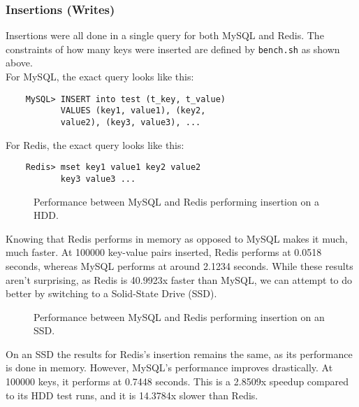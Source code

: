 \documentclass[letterpaper, 10 pt, conference]{ieeeconf}
\begin{document}
\subsubsection{Insertions (Writes)}
Insertions were all done in a single query for both MySQL and Redis. The constraints of how many keys were inserted are defined by \texttt{bench.sh} as shown above.\\
For MySQL, the exact query looks like this:
\begin{verbatim}
    MySQL> INSERT into test (t_key, t_value)
           VALUES (key1, value1), (key2,
           value2), (key3, value3), ...
\end{verbatim}
For Redis, the exact query looks like this:
\begin{verbatim}
    Redis> mset key1 value1 key2 value2
           key3 value3 ...
\end{verbatim}
\begin{figure}[h]
    \centering
    
    \caption{Performance between MySQL and Redis performing insertion on a HDD.}
    \label{fig:mesh1}
\end{figure}
Knowing that Redis performs in memory as opposed to MySQL makes it much, much faster. At 100000 key-value pairs inserted, Redis performs at 0.0518 seconds, whereas MySQL performs at around 2.1234 seconds. While these results aren't surprising, as Redis is 40.9923x faster than MySQL, we can attempt to do better by switching to a Solid-State Drive (SSD).
\begin{figure}[h]
    \centering
    
    \caption{Performance between MySQL and Redis performing insertion on an SSD.}
    \label{fig:mesh1}
\end{figure}
On an SSD the results for Redis's insertion remains the same, as its performance is done in memory. However, MySQL's performance improves drastically. At 100000 keys, it performs at 0.7448 seconds. This is a 2.8509x speedup compared to its HDD test runs, and it is 14.3784x slower than Redis.
\end{document}
